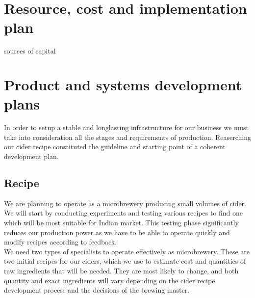 \documentclass{article}
\begin{document}
\section{Resource, cost and implementation plan}




sources of capital

\section{Product and systems development plans}
In order to setup a stable and longlasting infrastructure for our business we must take into consideration all the stages and requirements of production. Reaserching our cider recipe constituted the guideline and starting point of a coherent development plan. 

  \subsection{Recipe}
We are planning to operate as a microbrewery producing small volumes of cider. We will start by conducting experiments and testing various recipes to find one which will be most suitable for Indian market. This testing phase significantly reduces our production power as we have to be able to operate quickly and modify recipes according to feedback.\\

We need two types of specialists to operate effectively as microbrewery. These are two initial recipes for our ciders, which we use to estimate cost and quantities of raw ingredients that will be needed. They are most likely to change, and both quantity and exact ingredients will vary depending on the cider recipe development process and the decisions of the brewing master.
\end{document}
